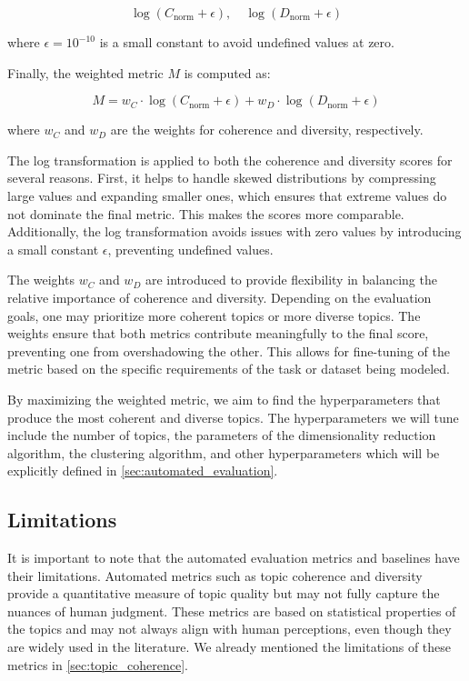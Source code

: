 \[
\log(C_{\text{norm}} + \epsilon), \quad \log(D_{\text{norm}} + \epsilon)
\]

where \( \epsilon = 10^{-10} \) is a small constant to avoid undefined values at zero.

Finally, the weighted metric \( M \) is computed as:

\[
M = w_C \cdot \log(C_{\text{norm}} + \epsilon) + w_D \cdot \log(D_{\text{norm}} + \epsilon)
\]

where \( w_C \) and \( w_D \) are the weights for coherence and diversity, respectively.

The log transformation is applied to both the coherence and diversity scores for several reasons. First, it helps to handle skewed distributions by compressing large values and expanding smaller ones, which ensures that extreme values do not dominate the final metric. This makes the scores more comparable. Additionally, the log transformation avoids issues with zero values by introducing a small constant \( \epsilon \), preventing undefined values.

The weights \( w_C \) and \( w_D \) are introduced to provide flexibility in balancing the relative importance of coherence and diversity. Depending on the evaluation goals, one may prioritize more coherent topics or more diverse topics. The weights ensure that both metrics contribute meaningfully to the final score, preventing one from overshadowing the other. This allows for fine-tuning of the metric based on the specific requirements of the task or dataset being modeled.

By maximizing the weighted metric, we aim to find the hyperparameters that produce the most coherent and diverse topics. The hyperparameters we will tune include the number of topics, the parameters of the dimensionality reduction algorithm, the clustering algorithm, and other hyperparameters which will be explicitly defined in \cref{sec:automated_evaluation}.

\subsection{Limitations}
It is important to note that the automated evaluation metrics and baselines have their limitations. Automated metrics such as topic coherence and diversity provide a quantitative measure of topic quality but may not fully capture the nuances of human judgment. These metrics are based on statistical properties of the topics and may not always align with human perceptions, even though they are widely used in the literature. We already mentioned the limitations of these metrics in \cref{sec:topic_coherence}.

